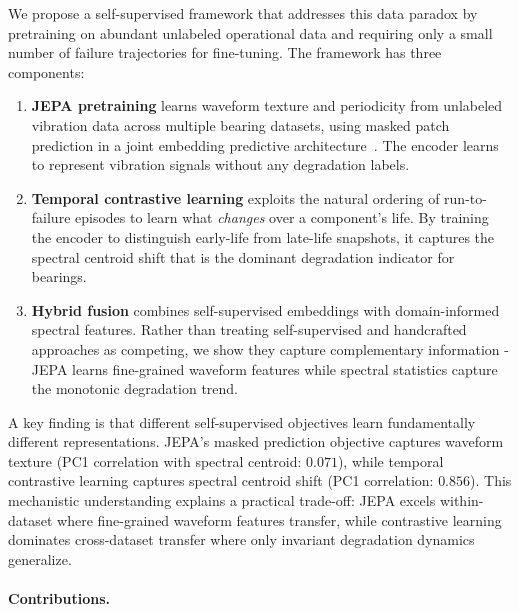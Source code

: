 We propose a self-supervised framework that addresses this data paradox by pretraining on abundant unlabeled operational data and requiring only a small number of failure trajectories for fine-tuning. The framework has three components:

\begin{enumerate}[nosep]
  \item \textbf{JEPA pretraining} learns waveform texture and periodicity from unlabeled vibration data across multiple bearing datasets, using masked patch prediction in a joint embedding predictive architecture~\citep{assran2023ijepa}. The encoder learns to represent vibration signals without any degradation labels.

  \item \textbf{Temporal contrastive learning} exploits the natural ordering of run-to-failure episodes to learn what \emph{changes} over a component's life. By training the encoder to distinguish early-life from late-life snapshots, it captures the spectral centroid shift that is the dominant degradation indicator for bearings.

  \item \textbf{Hybrid fusion} combines self-supervised embeddings with domain-informed spectral features. Rather than treating self-supervised and handcrafted approaches as competing, we show they capture complementary information - JEPA learns fine-grained waveform features while spectral statistics capture the monotonic degradation trend.
\end{enumerate}

A key finding is that different self-supervised objectives learn fundamentally different representations. JEPA's masked prediction objective captures waveform texture (PC1 correlation with spectral centroid: $0.071$), while temporal contrastive learning captures spectral centroid shift (PC1 correlation: $0.856$). This mechanistic understanding explains a practical trade-off: JEPA excels within-dataset where fine-grained waveform features transfer, while contrastive learning dominates cross-dataset transfer where only invariant degradation dynamics generalize.

\paragraph{Contributions.}

